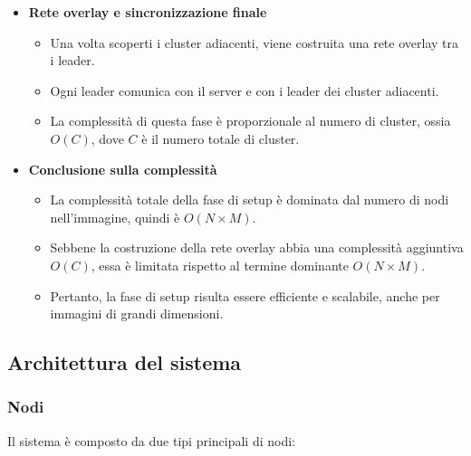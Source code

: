 \documentclass[12pt, a4paper]{report}
\begin{document}
\begin{itemize}
    \item \textbf{Rete overlay e sincronizzazione finale}
    \begin{itemize}
        \item Una volta scoperti i cluster adiacenti, viene costruita una rete overlay tra i leader.
        \item Ogni leader comunica con il server e con i leader dei cluster adiacenti.
        \item La complessit\`a di questa fase \`e proporzionale al numero di cluster, ossia $O(C)$, dove $C$ \`e il numero totale di cluster.
    \end{itemize}

    \item \textbf{Conclusione sulla complessit\`a}
    \begin{itemize}
        \item La complessit\`a totale della fase di setup \`e dominata dal numero di nodi nell'immagine, quindi \`e $O(N \times M)$.
        \item Sebbene la costruzione della rete overlay abbia una complessit\`a aggiuntiva $O(C)$, essa \`e limitata rispetto al termine dominante $O(N \times M)$.
        \item Pertanto, la fase di setup risulta essere efficiente e scalabile, anche per immagini di grandi dimensioni.
    \end{itemize}
\end{itemize}

\subsection{Architettura del sistema}

\subsubsection{Nodi}
Il sistema \`e composto da due tipi principali di nodi:
\end{document}
